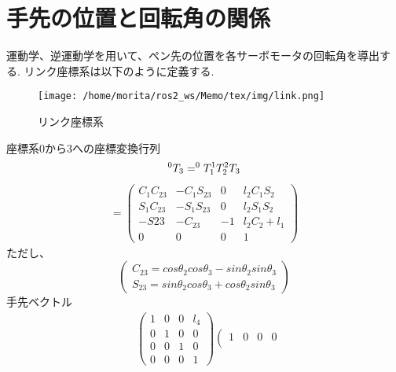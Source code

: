 \documentclass[a4j]{jarticle}			%
\begin{document}
\section{手先の位置と回転角の関係}

運動学、逆運動学を用いて、ペン先の位置を各サーボモータの回転角を導出する.
リンク座標系は以下のように定義する.
\begin{figure}[htbp]
\begin{center}
\texttt{[image: /home/morita/ros2\_ws/Memo/tex/img/link.png]}
\caption{リンク座標系}
\end{center}
\end{figure}

\begin{multicols}{2} %

座標系0から3への座標変換行列 
\small
$$
	^{0}T_{3}=^{0}T_{1} ^{1}T_{2} ^{2}T_{3} \\
$$
\begin{equation*}
	\begin{array}{cc}
		=
		\left( 
			\begin{array}{cccc}
				C_1C_{23} & -C_1S_{23} & 0 & l_2C_1S_2 \\
				S_1C_{23} & -S_1S_{23} & 0 & l_2S_1S_2 \\
				-S{23} & -C_{23} & -1 & l_2C_2 + l_1 \\
				0 & 0 & 0 & 1 
			\end{array}
		\right)
	\end{array}
\end{equation*}
\normalsize
ただし、
\begin{equation*}
	\left(
	\begin{split}
		C_{23} = cos\theta_2cos\theta_3-sin\theta_2sin\theta_3\\
		S_{23} = sin\theta_2cos\theta_3+cos\theta_2sin\theta_3	
	\end{split}
	\right)
\end{equation*}
\normalsize
手先ベクトル
\tiny
\begin{equation*}
	\begin{array}{cccc}
		&\left( 
			\begin{array}{cccc}
				1 & 0 & 0 & l_4\\
				0 & 1 & 0 & 0\\
				0 & 0 & 1 & 0\\
				0 & 0 & 0 & 1 
			\end{array}
		\right)
		\left( 
			\begin{array}{cccc}
				1 & 0 & 0 & 0\\

\end{array}
\end{array}
\end{equation*}
\end{multicols}
\end{document}
